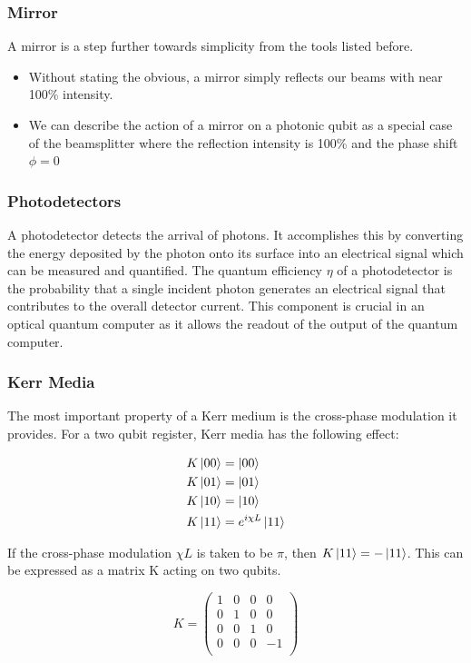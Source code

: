 \subsubsection{Mirror}
A mirror is a step further towards simplicity from the tools listed before.
\begin{itemize}
    \item Without stating the obvious, a mirror simply reflects our beams with near 100\% intensity.

    \item We can describe the action of a mirror on a photonic qubit as a special case of the beamsplitter where the reflection intensity is 100\% and the phase shift $\phi = 0$
\end{itemize}
\subsubsection{Photodetectors}
A photodetector detects the arrival of photons. It accomplishes this by converting the energy deposited by the photon onto its surface into an electrical signal which can be measured and quantified. The quantum efficiency $\eta$ of a photodetector is the probability that a single incident photon generates an electrical signal that contributes to the overall detector current. This component is crucial in an optical quantum computer as it allows the readout of the output of the quantum computer. 


\subsubsection{Kerr Media}

The most important property of a Kerr medium is the cross-phase modulation it provides. For a two qubit register, Kerr media has the following effect:

\begin{align*} 
    K \ket{00} &=  \ket{00}\\
    K \ket{01} &=  \ket{01}\\
    K \ket{10} &=  \ket{10}\\
    K \ket{11} &=  e^{i\chi L}\ket{11}
    \end{align*}
    
If the cross-phase modulation $\chi L$ is taken to be $\pi$, then $K \ket{11} =  -\ket{11}$. This can be expressed as a matrix K acting on two qubits.

$$K = \begin{pmatrix}
    1 & 0 & 0 & 0\\
    0 & 1 & 0 & 0\\
    0 & 0 & 1 & 0\\
    0 & 0 & 0 & -1\\
    \end{pmatrix}$$

